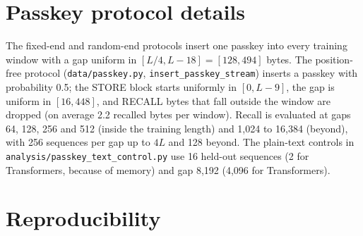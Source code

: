 \documentclass[11pt]{article}
\begin{document}
\section{Passkey protocol details}\label{sec:passkey-details}

The fixed-end and random-end protocols insert one passkey into every training window with a gap uniform in $[L/4, L - 18] = [128, 494]$ bytes. The position-free protocol (\texttt{data/passkey.py}, \texttt{insert\_passkey\_stream}) inserts a passkey with probability 0.5; the STORE block starts uniformly in $[0, L - 9]$, the gap is uniform in $[16, 448]$, and RECALL bytes that fall outside the window are dropped (on average 2.2 recalled bytes per window). Recall is evaluated at gaps 64, 128, 256 and 512 (inside the training length) and 1,024 to 16,384 (beyond), with 256 sequences per gap up to $4L$ and 128 beyond. The plain-text controls in \texttt{analysis/passkey\_text\_control.py} use 16 held-out sequences (2 for Transformers, because of memory) and gap 8,192 (4,096 for Transformers).

\section{Reproducibility}\label{sec:repro}
\end{document}
